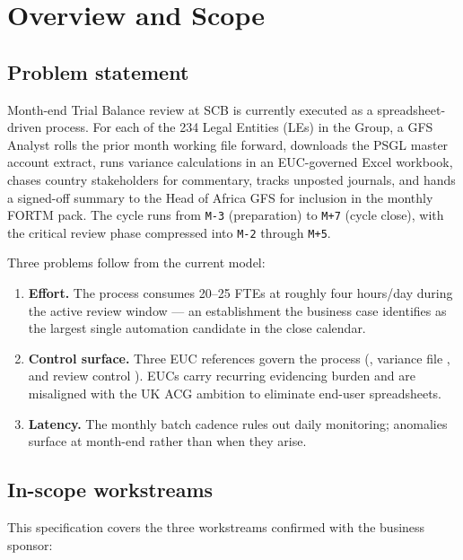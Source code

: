 \chapter{Overview and Scope}\label{ch:overview}

\section{Problem statement}

Month-end Trial Balance review at SCB is currently executed as a
spreadsheet-driven process. For each of the 234 Legal Entities (LEs)
in the Group, a GFS Analyst rolls the prior month working file
forward, downloads the PSGL master account extract, runs variance
calculations in an EUC-governed Excel workbook, chases country
stakeholders for commentary, tracks unposted journals, and hands a
signed-off summary to the Head of Africa GFS for inclusion in the
monthly FORTM pack. The cycle runs from \texttt{M-3} (preparation) to
\texttt{M+7} (cycle close), with the critical review phase compressed
into \texttt{M-2} through \texttt{M+5}.

Three problems follow from the current model:

\begin{enumerate}
  \item \textbf{Effort.} The process consumes 20--25 FTEs at roughly
        four hours/day during the active review window --- an
        establishment the business case identifies as the largest
        single automation candidate in the close calendar.
  \item \textbf{Control surface.} Three EUC references govern the
        process (, variance file
        , and review control
        ). EUCs carry recurring
        evidencing burden and are misaligned with the UK ACG ambition
        to eliminate end-user spreadsheets.
  \item \textbf{Latency.} The monthly batch cadence rules out daily
        monitoring; anomalies surface at month-end rather than when
        they arise.
\end{enumerate}

\section{In-scope workstreams}

This specification covers the three workstreams confirmed with the
business sponsor:

